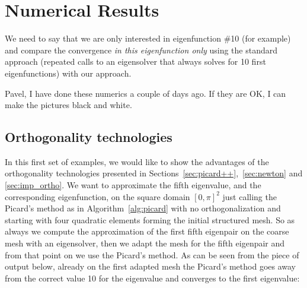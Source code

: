 \documentclass[preprint,12pt]{elsarticle}
\begin{document}









\section{Numerical Results} \label{sec:numer}

{\red We need to say that we are only interested in eigenfunction \#10 (for example)
and compare the convergence {\em in this eigenfunction only} 
using the standard approach (repeated calls to an 
eigensolver that always solves for 10 first eigenfunctions) with our approach.}

{\red Pavel, I have done these numerics a couple of days ago. If they are OK, I can make the pictures black and white.}

\subsection{Orthogonality technologies}\label{ssec:ortho}

In this first set of examples, we would like to show the advantages of the orthogonality technologies presented in Sections~\ref{sec:picard++},~\ref{sec:newton} and \ref{sec:imp_ortho}.
We want to approximate the fifth eigenvalue, and the corresponding eigenfunction, on the square domain $[0,\pi]^2$ just calling the Picard's method as in Algorithm~\ref{alg:picard} with no orthogonalization and starting with four quadratic elements forming the initial structured mesh.
So as always we compute the approximation of the first fifth eigenpair on the coarse mesh with an eigensolver, then we adapt the mesh for the fifth eigenpair and from that point on we use the Picard's method.
As can be seen from the piece of output below, already on the first adapted mesh the Picard's method goes away from the correct value 10 for the eigenvalue and converges to the first eigenvalue: 
\end{document}
